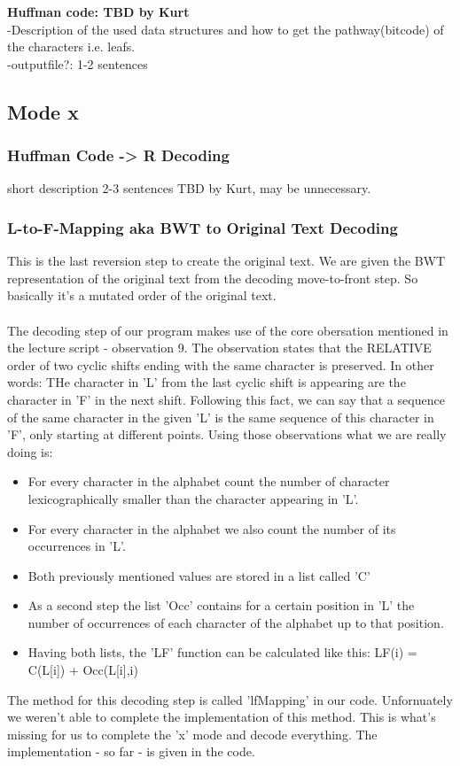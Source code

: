 \documentclass[11pt, notitlepage]{scrartcl}
\begin{document}
\textbf{Huffman code: TBD by Kurt}\\
-Description of the used data structures and how to get the pathway(bitcode) of the characters i.e. leafs.\\
-outputfile?: 1-2 sentences

\subsection{Mode x}
\subsubsection{Huffman Code -> R Decoding}
short description 2-3 sentences TBD by Kurt, may be unnecessary.
\subsubsection{L-to-F-Mapping aka BWT to Original Text Decoding}
This is the last reversion step to create the original text. We are given the BWT representation of the original text
from the decoding move-to-front step. So basically it's a mutated order of the original text. \\\\
The decoding step of our program makes use of the core obersation mentioned in the lecture script - observation 9. The
observation states that the RELATIVE order of two cyclic shifts ending with the same character is preserved. In other
words:
THe character in 'L' from the last cyclic shift is appearing are the character in 'F' in the next shift. Following this
fact, we can say that a sequence of the same character in the given 'L' is the same sequence of this character in 'F',
only starting at different points. Using those observations what we are really doing is: 
\begin{itemize}
    \item For every character in the alphabet count the number of character lexicographically smaller than the character
    appearing in 'L'.
    \item For every character in the alphabet we also count the number of its occurrences in 'L'.
    \item Both previously mentioned values are stored in a list called 'C'
    \item As a second step the list 'Occ' contains for a certain position in 'L' the number of occurrences of each
    character of the alphabet up to that position.
    \item Having both lists, the 'LF' function can be calculated like this: LF(i) = C(L[i]) + Occ(L[i],i)
\end{itemize}
The method for this decoding step is called 'lfMapping' in our code. Unfornuately we weren't able to complete the
implementation of this method. This is what's missing for us to complete the 'x' mode and decode everything. The
implementation - so far - is given in the code.
\end{document}
